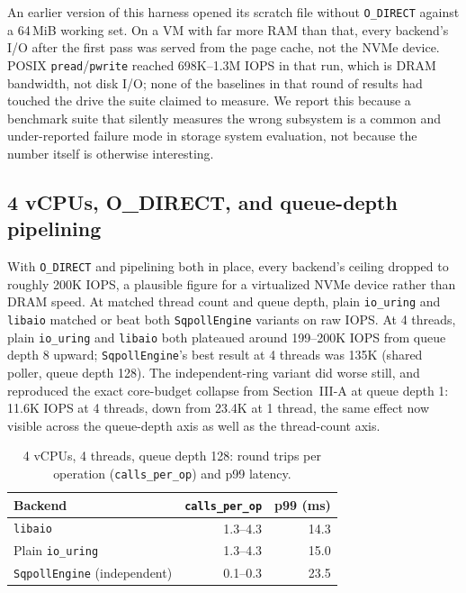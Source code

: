 \documentclass[conference]{IEEEtran}
\begin{document}
An earlier version of this harness opened its scratch file without \texttt{O\_DIRECT} against a
64\,MiB working set. On a VM with far more RAM than that, every backend's I/O after the first
pass was served from the page cache, not the NVMe device. POSIX \texttt{pread}/\texttt{pwrite}
reached 698K--1.3M IOPS in that run, which is DRAM bandwidth, not disk I/O; none of the baselines
in that round of results had touched the drive the suite claimed to measure. We report this
because a benchmark suite that silently measures the wrong subsystem is a common and
under-reported failure mode in storage system evaluation, not because the number itself is
otherwise interesting.

\subsection{4 vCPUs, O\_DIRECT, and queue-depth pipelining}

With \texttt{O\_DIRECT} and pipelining both in place, every backend's ceiling dropped to roughly
200K IOPS, a plausible figure for a virtualized NVMe device rather than DRAM speed. At matched
thread count and queue depth, plain \texttt{io\_uring} and \texttt{libaio} matched or beat both
\texttt{SqpollEngine} variants on raw IOPS. At 4 threads, plain \texttt{io\_uring} and
\texttt{libaio} both plateaued around 199--200K IOPS from queue depth 8 upward;
\texttt{SqpollEngine}'s best result at 4 threads was 135K (shared poller, queue depth 128). The
independent-ring variant did worse still, and reproduced the exact core-budget collapse from
Section~III-A at queue depth 1: 11.6K IOPS at 4 threads, down from 23.4K at 1 thread, the same
effect now visible across the queue-depth axis as well as the thread-count axis.

\begin{table}[t]
\centering
\caption{4 vCPUs, 4 threads, queue depth 128: round trips per operation
(\texttt{calls\_per\_op}) and p99 latency.}
\label{tab:4vcpu-calls}
\begin{tabular}{lrr}
\toprule
Backend & \texttt{calls\_per\_op} & p99 (ms) \\
\midrule
\texttt{libaio} & 1.3--4.3 & 14.3 \\
Plain \texttt{io\_uring} & 1.3--4.3 & 15.0 \\
\texttt{SqpollEngine} (independent) & 0.1--0.3 & 23.5 \\
\bottomrule
\end{tabular}
\end{table}
\end{document}
